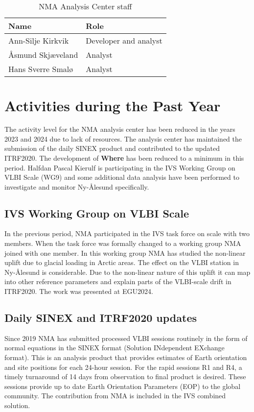 \documentclass[twocolumn,twoside]{svmultivs_br} %
\begin{document}
\begin{table}[htb!]
\caption{NMA Analysis Center staff}
\begin{center}
\begin{tabularx}{\linewidth}{X|X}
\hline
Name  & Role \\
\hline
Ann-Silje Kirkvik & Developer and analyst \\
\AA smund Skj\ae veland & Analyst \\
Hans Sverre Smal\o & Analyst \\
\hline
\end{tabularx}
\end{center}
\label{tab:staff}
\end{table}
%
\section{Activities during the Past Year}
The activity level for the NMA analysis center has been reduced in the years 2023 and 2024 due to lack 
of resources. The analysis center has maintained the submission of the daily SINEX product and contributed
to the updated ITRF2020. The development of \textbf{Where} has been reduced to a minimum in this period. 
Halfdan Pascal Kierulf is participating in the IVS Working Group on VLBI Scale (WG9) and some additional data 
analysis have been performed to investigate and monitor Ny-\AA lesund specifically.

\subsection{IVS Working Group on VLBI Scale}
In the previous period, NMA participated in the IVS task force on scale \cite{biennial-acnma2021} with two members. When
the task force was formally changed to a working group NMA joined with one member. In this working group NMA has studied
the non-linear uplift due to glacial loading in Arctic areas. The effect on the VLBI station in Ny-Ålesund is considerable. 
Due to the non-linear nature of this uplift it can map into other reference parameters and explain parts of the VLBI-scale 
drift in ITRF2020. The work was presented at EGU2024.

\subsection{Daily SINEX and ITRF2020 updates}
Since 2019 NMA has submitted processed VLBI sessions routinely in the form of normal equations in the SINEX
format (Solution INdependent EXchange format). This is an analysis product that provides estimates of Earth 
orientation and site positions for each 24-hour session. For the rapid sessions R1 and R4, a timely turnaround 
of 14 days from observation to final product is desired. These sessions provide up to date Earth Orientation 
Parameters (EOP) to the global community. The contribution from NMA is included in the IVS combined solution.
\end{document}
